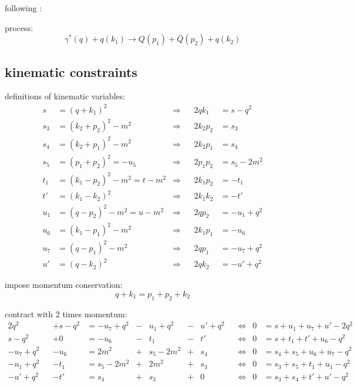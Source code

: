 following \cite{PhysRevD.40.54,van_neerven_dimensional_1986,Marco}:

process:
\begin{equation}
\gamma^*(q) + q(k_1) \rightarrow Q(p_1)+\bar{Q}(p_2) + q(k_2)
\end{equation}

\subsection{kinematic constraints}

definitions of kinematic variables:
\begin{align}
s &= (q+k_1)^2 &\Rightarrow& &2qk_1 &= s-q^2\\
s_3 &= (k_2+p_2)^2-m^2  &\Rightarrow& &2k_2p_2 &= s_3\\
s_4 &= (k_2+p_1)^2-m^2  &\Rightarrow& &2k_2p_1 &= s_4\\
s_5 &= (p_1+p_2)^2 = -u_5  &\Rightarrow& &2p_1p_2 &= s_5-2m^2\\
t_1 &= (k_1-p_2)^2-m^2 = t - m^2  &\Rightarrow& &2k_1p_2 &=-t_1\\
t' &= (k_1-k_2)^2  &\Rightarrow& &2k_1k_2 &= -t'\\
u_1 &= (q-p_2)^2-m^2 = u - m^2  &\Rightarrow& &2qp_2 &=-u_1+q^2\\
u_6 &= (k_1-p_1)^2 - m^2  &\Rightarrow& &2k_1p_1 &=-u_6\\
u_7 &= (q-p_1)^2 - m^2  &\Rightarrow& &2qp_1 &=-u_7+q^2\\
u' &= (q-k_2)^2  &\Rightarrow& &2qk_2 &=-u'+q^2
\end{align}

impose momentum conservation:
\begin{equation}
q+k_1 = p_1+p_2+k_2
\end{equation}

contract with 2 times momentum:
\begin{align}
2q^2 && +s-q^2 &=-u_7+q^2 &-& u_1+q^2 &-& u'+q^2 &&\Leftrightarrow &0 &=s+u_1+u_7+u'-2q^2 \label{eq:MomCon3wq} \\
s-q^2 && +0 &= -u_6 &-& t_1 &-& t' &&\Leftrightarrow &0 &= s+t_1+t'+u_6-q^2 \label{eq:MomCon3wk1}\\
-u_7+q^2 && -u_6 &= 2m^2 &+& s_5-2m^2 &+& s_4 &&\Leftrightarrow &0 &= s_4+s_5+u_6+u_7-q^2 \label{eq:MomCon3wp1}\\
-u_1+q^2 && -t_1 &= s_5-2m^2 &+& 2m^2 &+& s_3 &&\Leftrightarrow &0 &= s_3+s_5+t_1+u_1-q^2 \label{eq:MomCon3wp2}\\
-u'+q^2 && -t' &= s_4 &+& s_3 &+& 0 &&\Leftrightarrow &0 &= s_3+s_4+t'+u'-q^2 \label{eq:MomCon3wk2}
\end{align}

